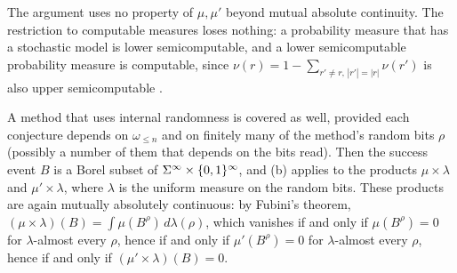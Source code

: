 The argument uses no property of $\mu,\mu'$ beyond mutual absolute continuity. The
restriction to computable measures loses nothing: a probability measure that has a
stochastic model is lower semicomputable, and a lower semicomputable probability
measure is computable, since $\nu(r)=1-\sum_{r'\ne r,\,|r'|=|r|}\nu(r')$ is also upper
semicomputable \citep{li-vitanyi2019}.

A method that uses internal randomness is covered as well, provided each conjecture
depends on $\omega_{\le n}$ and on finitely many of the method's random bits $\rho$
(possibly a number of them that depends on the bits read). Then the success event $B$
is a Borel subset of $\Sigma^{\infty}\times\{0,1\}^{\infty}$, and (b) applies to the products
$\mu\times\lambda$ and $\mu'\times\lambda$, where $\lambda$ is the uniform measure on the
random bits. These products are again mutually absolutely continuous: by Fubini's
theorem, $(\mu\times\lambda)(B)=\int\mu(B^{\rho})\,d\lambda(\rho)$, which vanishes if and
only if $\mu(B^{\rho})=0$ for $\lambda$-almost every $\rho$, hence if and only if
$\mu'(B^{\rho})=0$ for $\lambda$-almost every $\rho$, hence if and only if
$(\mu'\times\lambda)(B)=0$.


